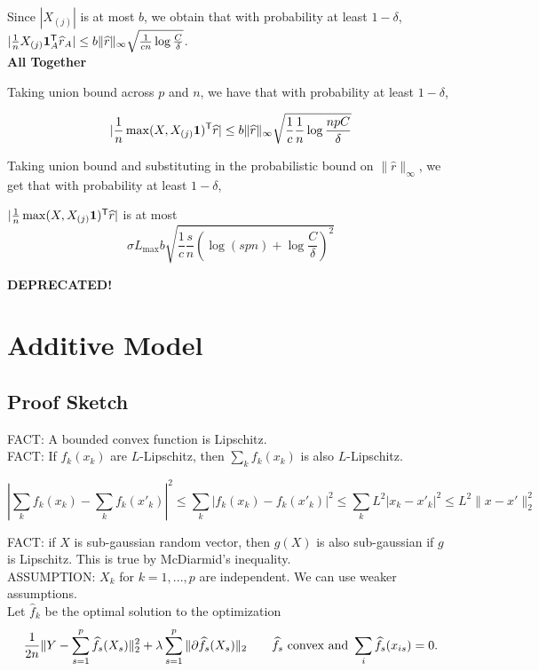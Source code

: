 \documentclass{article}
\begin{document}
Since $|X_{(j)}|$ is at most $b$, we obtain that with probability at least $1-\delta$, $| \frac{1}{n} X_{(j)} \mathbf{1}_A^{\mathsf{T}} \widehat{r}_A| \leq b\| \widehat{r} \|_\infty \sqrt{ \frac{1}{cn} \log \frac{C}{\delta}}$.\\

\textbf{All Together}

Taking union bound across $p$ and $n$, we have that with probability at least $1-\delta$, 

\[
| \frac{1}{n} \max(X, X_{(j)}\mathbf{1})^{\mathsf{T}} \widehat{r}| \leq b \|\widehat{r}\|_\infty \sqrt{ \frac{1}{c} \frac{1}{n} \log \frac{np C }{\delta}}
\]

Taking union bound and substituting in the probabilistic bound on $\|\hat{r}\|_\infty$, we get that with probability at least $1-\delta$,

$| \frac{1}{n} \max(X, X_{(j)}\mathbf{1})^{\mathsf{T}} \widehat{r}|$ is at most 
\[
\sigma L_{\max} b \sqrt{ \frac{1}{c} \frac{s}{n} ( \log (spn) + \log \frac{C}{\delta})^2}
\]


\newpage




\textbf{DEPRECATED!}\\ %




\section{Additive Model}
\subsection{Proof Sketch}

FACT: A bounded convex function is Lipschitz. \\

FACT: If $f_k(x_k)$ are $L$-Lipschitz, then $\sum_k f_k(x_k)$ is also $L$-Lipschitz.

\[
| \sum_k f_k(x_k) - \sum_k f_k(x'_k) |^2 \leq \sum_k |f_k(x_k) - f_k(x'_k)|^2 \leq \sum_k L^2| x_k - x'_k |^2 \leq L^2 \| x - x' \|_2^2
\]

FACT: if $X$ is sub-gaussian random vector, then $g(X)$ is also sub-gaussian if $g$ is Lipschitz. This is true by McDiarmid's inequality.\\

ASSUMPTION: $X_k$ for $k=1,...,p$ are independent. We can use weaker assumptions. \\

Let $\hat{f}_k$ be the optimal solution to the optimization
\[
\frac{1}{2n} \| Y - \sum_{s=1}^p \widehat{f}_s(X_s) \|_2^2 + \lambda\sum_{s=1}^p \| \partial \widehat{f}_s(X_s)\|_2 \qquad \widehat{f}_s \textrm{ convex and } \sum_i \widehat{f}_s (x_{is}) = 0 .
\]
\end{document}
